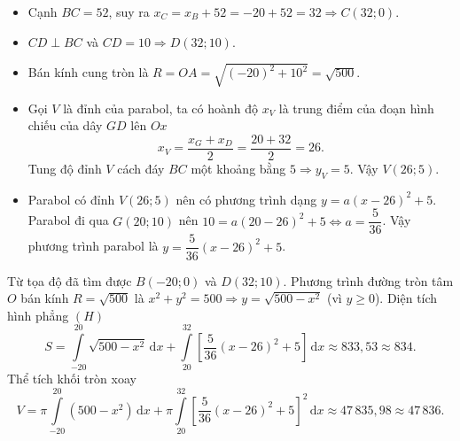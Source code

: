 \begin{ex}
{{}
		\begin{itemize}
			\item Cạnh $BC=52$, suy ra $x_C = x_B + 52 = -20 + 52 = 32 \Rightarrow C(32; 0)$.
			\item $CD \perp BC$ và $CD=10 \Rightarrow D(32; 10)$.
			\item Bán kính cung tròn là $R = OA = \sqrt{(-20)^2 + 10^2} = \sqrt{500}$.
			\item Gọi $V$ là đỉnh của parabol, ta có hoành độ $x_V$ là trung điểm của đoạn hình chiếu của dây $GD$ lên $Ox$
			\[x_V = \dfrac{x_G + x_D}{2} = \dfrac{20+32}{2} = 26.\]
			Tung độ đỉnh $V$ cách đáy $BC$ một khoảng bằng $5 \Rightarrow y_V = 5$. Vậy $V(26; 5)$.
			\item Parabol có đỉnh $V(26;5)$ nên có phương trình dạng $y=a(x-26)^2+5$. Parabol đi qua $G(20;10)$ nên $10=a(20-26)^2+5 \Leftrightarrow a=\dfrac{5}{36}$. Vậy phương trình parabol là $y=\dfrac{5}{36}(x-26)^2+5$.
		\end{itemize}
		\begin{itemchoice}
			\itemch Từ tọa độ đã tìm được $B(-20; 0)$ và $D(32; 10)$.
			\itemch Phương trình đường tròn tâm $O$ bán kính $R=\sqrt{500}$ là $x^2 + y^2 = 500 \Rightarrow y = \sqrt{500 - x^2}$ (vì $y \ge 0$).
			\itemch Diện tích hình phẳng $(H)$
			\[S = \displaystyle\int\limits_{-20}^{20} \sqrt{500-x^2} \mathrm{\,d}x + \displaystyle\int\limits_{20}^{32} \left[ \dfrac{5}{36}(x-26)^2 + 5 \right] \mathrm{\,d}x\approx 833{,}53\approx 834.\]
			\itemch Thể tích khối tròn xoay
			\[V = \pi \displaystyle\int\limits_{-20}^{20} (500-x^2) \mathrm{\,d}x + \pi \displaystyle\int\limits_{20}^{32} \left[ \dfrac{5}{36}(x-26)^2 + 5 \right]^2 \mathrm{\,d}x\approx 47\,835{,}98\approx 47\,836.\]
		\end{itemchoice}
	}
\end{ex}

